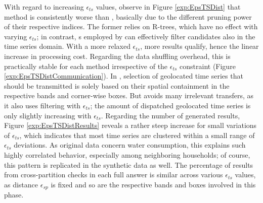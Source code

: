 With regard to increasing $\epsilon_{ts}$ values, observe in Figure \ref{exp:EpsTSDist} that method \base is consistently worse than \opt, basically due to the different pruning power of their respective indices. The former relies on R-trees, which have no effect with varying $\epsilon_{ts}$; in contrast, {\btsr}s employed by \opt can effectively filter candidates also in the time series domain. With a more relaxed $\epsilon_{ts}$, more results qualify, hence the linear increase in processing cost. Regarding the data shuffling overhead, this is practically stable for each method irrespective of the $\epsilon_{ts}$ constraint (Figure \ref{exp:EpsTSDistCommunication}). In \base, selection of geolocated time series that should be transmitted is solely based on their spatial containment in the respective bands and corner-wise boxes. But \opt avoids many irrelevant transfers, as it also uses filtering with $\epsilon_{ts}$; the amount of dispatched geolocated time series is only slightly increasing with $\epsilon_{ts}$. Regarding the number of generated results, Figure \ref{exp:EpsTSDistResults} reveals a rather steep increase for small variations of $\epsilon_{ts}$, which indicates that most time series are clustered within a small range of $\epsilon_{ts}$ deviations. As original data concern water consumption, this explains such highly correlated behavior, especially among neighboring households; of course, this pattern is replicated in the synthetic data as well. The percentage of results from cross-partition checks in each full answer is similar across various $\epsilon_{ts}$ values, as distance $\epsilon_{sp}$ is fixed and so are the respective bands and boxes involved in this phase.

